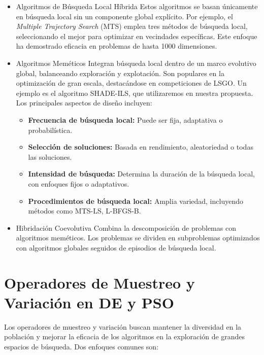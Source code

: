 \begin{itemize}
\item{Algoritmos de Búsqueda Local Híbrida}
Estos algoritmos se basan únicamente en búsqueda local sin un componente global explícito. Por ejemplo, el \textit{Multiple Trajectory Search} (MTS) emplea tres métodos de búsqueda local, seleccionando el mejor para optimizar en vecindades específicas. Este enfoque ha demostrado eficacia en problemas de hasta 1000 dimensiones.

\item{Algoritmos Meméticos}
Integran búsqueda local dentro de un marco evolutivo global, balanceando exploración y explotación. Son populares en la optimización de gran escala, destacándose en competiciones de LSGO. Un ejemplo es el algoritmo SHADE-ILS, que utilizaremos en nuestra propuesta. Los principales aspectos de diseño incluyen:
\begin{itemize}
    \item \textbf{Frecuencia de búsqueda local:} Puede ser fija, adaptativa o probabilística.
    \item \textbf{Selección de soluciones:} Basada en rendimiento, aleatoriedad o todas las soluciones.
    \item \textbf{Intensidad de búsqueda:} Determina la duración de la búsqueda local, con enfoques fijos o adaptativos.
    \item \textbf{Procedimientos de búsqueda local:} Amplia variedad, incluyendo métodos como MTS-LS, L-BFGS-B.
\end{itemize}

\item{Hibridación Coevolutiva}
Combina la descomposición de problemas con algoritmos meméticos. Los problemas se dividen en subproblemas optimizados con algoritmos globales seguidos de episodios de búsqueda local. 
\end{itemize}

\section{Operadores de Muestreo y Variación en DE y PSO}

Los operadores de muestreo y variación buscan mantener la diversidad en la población y mejorar la eficacia de los algoritmos en la exploración de grandes espacios de búsqueda. Dos enfoques comunes son:

